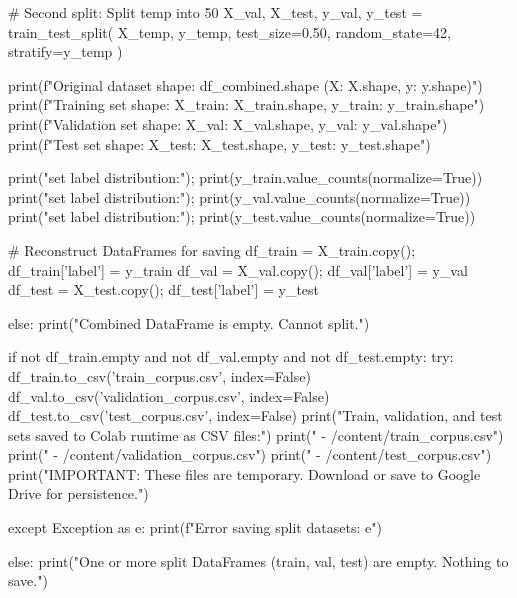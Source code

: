 \begin{ffcode}
            # Second split: Split temp into 50%
            X_val, X_test, y_val, y_test = train_test_split(
                X_temp, y_temp, test_size=0.50, random_state=42, stratify=y_temp
            )
    
            print(f"Original dataset shape: {df_combined.shape} (X: {X.shape}, y: {y.shape})")
            print(f"Training set shape: X_train: {X_train.shape}, y_train: {y_train.shape}")
            print(f"Validation set shape: X_val: {X_val.shape}, y_val: {y_val.shape}")
            print(f"Test set shape: X_test: {X_test.shape}, y_test: {y_test.shape}")
    
            print("\nTraining set label distribution:"); print(y_train.value_counts(normalize=True))
            print("\nValidation set label distribution:"); print(y_val.value_counts(normalize=True))
            print("\nTest set label distribution:"); print(y_test.value_counts(normalize=True))
    
            # Reconstruct DataFrames for saving
            df_train = X_train.copy(); df_train['label'] = y_train
            df_val = X_val.copy(); df_val['label'] = y_val
            df_test = X_test.copy(); df_test['label'] = y_test
    
    else:
        print("Combined DataFrame is empty. Cannot split.")

if not df_train.empty and not df_val.empty and not df_test.empty:
    try:
        df_train.to_csv('train_corpus.csv', index=False)
        df_val.to_csv('validation_corpus.csv', index=False)
        df_test.to_csv('test_corpus.csv', index=False)
        print("Train, validation, and test sets saved to Colab runtime as CSV files:")
        print(" - /content/train_corpus.csv")
        print(" - /content/validation_corpus.csv")
        print(" - /content/test_corpus.csv")
        print("IMPORTANT: These files are temporary. Download or save to Google Drive for persistence.")

    except Exception as e:
        print(f"Error saving split datasets: {e}")

else:
    print("One or more split DataFrames (train, val, test) are empty. Nothing to save.")
\end{ffcode}